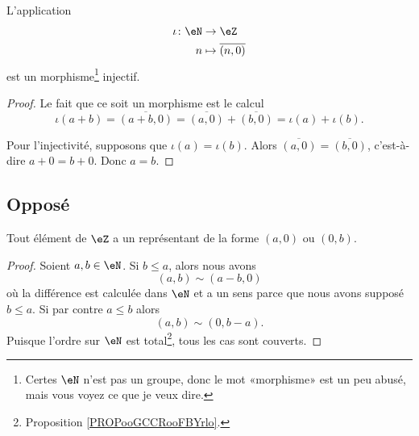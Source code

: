 \begin{proposition}
	L'application
	\begin{equation}
		\begin{aligned}
			\iota\colon \eN & \to \eZ                    \\
			n               & \mapsto \overline{ (n,0) }
		\end{aligned}
	\end{equation}
	est un morphisme\footnote{Certes \( \eN\) n'est pas un groupe, donc le mot «morphisme» est un peu abusé, mais vous voyez ce que je veux dire.} injectif.
\end{proposition}

\begin{proof}
	Le fait que ce soit un morphisme est le calcul
	\begin{equation}
		\iota(a+b)=\overline{ (a+b,0) }=\overline{ (a,0) }+\overline{ (b,0) }=\iota(a)+\iota(b).
	\end{equation}

	Pour l'injectivité, supposons que \( \iota(a)=\iota(b)\). Alors \( \overline{ (a,0) }=\overline{ (b,0) }\), c'est-à-dire \( a+0=b+0\). Donc \( a=b\).
\end{proof}

\subsection{Opposé}

\begin{lemma}       \label{LEMooSABNooZZDIes}
	Tout élément de \( \eZ\) a un représentant de la forme \( (a,0)\) ou \( (0,b)\).
\end{lemma}

\begin{proof}
	Soient \( a,b\in \eN\). Si \( b\leq a\), alors nous avons
	\begin{equation}
		(a,b)\sim(a-b,0)
	\end{equation}
	où la différence est calculée dans \( \eN\) et a un sens parce que nous avons supposé \( b\leq a\). Si par contre \( a\leq b\) alors
	\begin{equation}
		(a,b)\sim(0,b-a).
	\end{equation}
	Puisque l'ordre sur \( \eN\) est total\footnote{Proposition \ref{PROPooGCCRooFBYrlo}.}, tous les cas sont couverts.
\end{proof}

